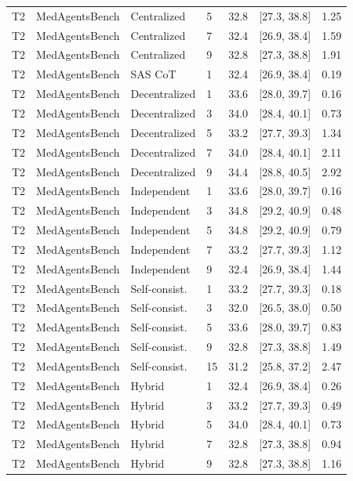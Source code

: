 \begin{table}[t]
\begin{tabular}{@{}llllrrr@{}}
T2 & MedAgentsBench & Centralized & 5 & 32.8 & [27.3, 38.8] & 1.25 \\
T2 & MedAgentsBench & Centralized & 7 & 32.4 & [26.9, 38.4] & 1.59 \\
T2 & MedAgentsBench & Centralized & 9 & 32.8 & [27.3, 38.8] & 1.91 \\
T2 & MedAgentsBench & SAS CoT & 1 & 32.4 & [26.9, 38.4] & 0.19 \\
T2 & MedAgentsBench & Decentralized & 1 & 33.6 & [28.0, 39.7] & 0.16 \\
T2 & MedAgentsBench & Decentralized & 3 & 34.0 & [28.4, 40.1] & 0.73 \\
T2 & MedAgentsBench & Decentralized & 5 & 33.2 & [27.7, 39.3] & 1.34 \\
T2 & MedAgentsBench & Decentralized & 7 & 34.0 & [28.4, 40.1] & 2.11 \\
T2 & MedAgentsBench & Decentralized & 9 & 34.4 & [28.8, 40.5] & 2.92 \\
T2 & MedAgentsBench & Independent & 1 & 33.6 & [28.0, 39.7] & 0.16 \\
T2 & MedAgentsBench & Independent & 3 & 34.8 & [29.2, 40.9] & 0.48 \\
T2 & MedAgentsBench & Independent & 5 & 34.8 & [29.2, 40.9] & 0.79 \\
T2 & MedAgentsBench & Independent & 7 & 33.2 & [27.7, 39.3] & 1.12 \\
T2 & MedAgentsBench & Independent & 9 & 32.4 & [26.9, 38.4] & 1.44 \\
T2 & MedAgentsBench & Self-consist. & 1 & 33.2 & [27.7, 39.3] & 0.18 \\
T2 & MedAgentsBench & Self-consist. & 3 & 32.0 & [26.5, 38.0] & 0.50 \\
T2 & MedAgentsBench & Self-consist. & 5 & 33.6 & [28.0, 39.7] & 0.83 \\
T2 & MedAgentsBench & Self-consist. & 9 & 32.8 & [27.3, 38.8] & 1.49 \\
T2 & MedAgentsBench & Self-consist. & 15 & 31.2 & [25.8, 37.2] & 2.47 \\
T2 & MedAgentsBench & Hybrid & 1 & 32.4 & [26.9, 38.4] & 0.26 \\
T2 & MedAgentsBench & Hybrid & 3 & 33.2 & [27.7, 39.3] & 0.49 \\
T2 & MedAgentsBench & Hybrid & 5 & 34.0 & [28.4, 40.1] & 0.73 \\
T2 & MedAgentsBench & Hybrid & 7 & 32.8 & [27.3, 38.8] & 0.94 \\
T2 & MedAgentsBench & Hybrid & 9 & 32.8 & [27.3, 38.8] & 1.16 \\

\end{tabular}
\end{table}
